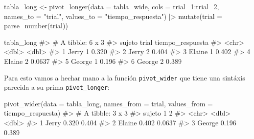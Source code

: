 \documentclass[
  letterpaper,
  DIV=11,
  numbers=noendperiod,
  oneside]{scrreprt}
\newenvironment{Shaded}{\begin{snugshade}}{\end{snugshade}}
\newcommand{\AttributeTok}[1]{\textcolor[rgb]{0.40,0.45,0.13}{#1}}
\newcommand{\CommentTok}[1]{\textcolor[rgb]{0.37,0.37,0.37}{#1}}
\newcommand{\FunctionTok}[1]{\textcolor[rgb]{0.28,0.35,0.67}{#1}}
\newcommand{\NormalTok}[1]{\textcolor[rgb]{0.00,0.23,0.31}{#1}}
\newcommand{\OtherTok}[1]{\textcolor[rgb]{0.00,0.23,0.31}{#1}}
\newcommand{\SpecialCharTok}[1]{\textcolor[rgb]{0.37,0.37,0.37}{#1}}
\newcommand{\StringTok}[1]{\textcolor[rgb]{0.13,0.47,0.30}{#1}}
\begin{document}
\begin{Shaded}
\begin{Highlighting}[]
\NormalTok{tabla\_long }\OtherTok{\textless{}{-}} \FunctionTok{pivot\_longer}\NormalTok{(}\AttributeTok{data =}\NormalTok{ tabla\_wide, }
                           \AttributeTok{cols =}\NormalTok{ trial\_1}\SpecialCharTok{:}\NormalTok{trial\_2, }
                           \AttributeTok{names\_to =} \StringTok{"trial"}\NormalTok{,}
                           \AttributeTok{values\_to =} \StringTok{"tiempo\_respuesta"}\NormalTok{) }\SpecialCharTok{|\textgreater{}}
  \FunctionTok{mutate}\NormalTok{(}\AttributeTok{trial =} \FunctionTok{parse\_number}\NormalTok{(trial))}

\NormalTok{tabla\_long}
\CommentTok{\#\textgreater{} \# A tibble: 6 x 3}
\CommentTok{\#\textgreater{}   sujeto trial tiempo\_respuesta}
\CommentTok{\#\textgreater{}   \textless{}chr\textgreater{}  \textless{}dbl\textgreater{}            \textless{}dbl\textgreater{}}
\CommentTok{\#\textgreater{} 1 Jerry      1           0.320 }
\CommentTok{\#\textgreater{} 2 Jerry      2           0.404 }
\CommentTok{\#\textgreater{} 3 Elaine     1           0.402 }
\CommentTok{\#\textgreater{} 4 Elaine     2           0.0637}
\CommentTok{\#\textgreater{} 5 George     1           0.196 }
\CommentTok{\#\textgreater{} 6 George     2           0.389}
\end{Highlighting}
\end{Shaded}

Para esto vamos a hechar mano a la función
\texttt{pivot\_wider}
que tiene una sintáxis parecida a su prima \texttt{pivot\_longer}:

\begin{Shaded}
\begin{Highlighting}[]
\FunctionTok{pivot\_wider}\NormalTok{(}\AttributeTok{data =}\NormalTok{ tabla\_long, }
            \AttributeTok{names\_from =}\NormalTok{ trial, }
            \AttributeTok{values\_from =}\NormalTok{ tiempo\_respuesta)}
\CommentTok{\#\textgreater{} \# A tibble: 3 x 3}
\CommentTok{\#\textgreater{}   sujeto   \textasciigrave{}1\textasciigrave{}    \textasciigrave{}2\textasciigrave{}}
\CommentTok{\#\textgreater{}   \textless{}chr\textgreater{}  \textless{}dbl\textgreater{}  \textless{}dbl\textgreater{}}
\CommentTok{\#\textgreater{} 1 Jerry  0.320 0.404 }
\CommentTok{\#\textgreater{} 2 Elaine 0.402 0.0637}
\CommentTok{\#\textgreater{} 3 George 0.196 0.389}
\end{Highlighting}
\end{Shaded}
\end{document}
